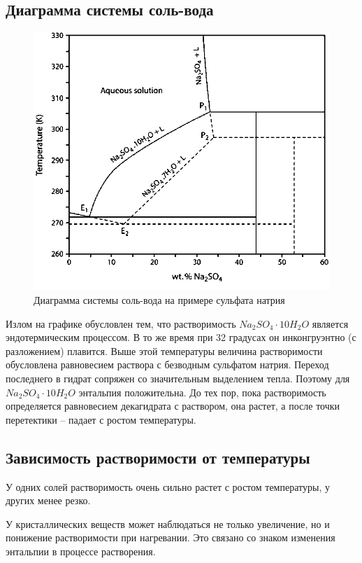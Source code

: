 \documentclass[14pt,a4paper]{scrartcl}
\begin{document}
\subsection*{Диаграмма системы соль-вода}
\begin{figure}[htp]
\centering
\includegraphics[scale=1.00]{h2o-diagram.png}
\caption{Диаграмма системы соль-вода на примере сульфата натрия}
\label{}
\end{figure}


Излом на графике обусловлен тем, что растворимость $Na_2SO_4\cdot10H_2O$ является эндотермическим процессом. В то же время при 32 градусах он инконгруэнтно (с разложением) плавится. Выше этой температуры величина растворимости обусловлена равновесием раствора с безводным сульфатом натрия. Переход последнего в гидрат сопряжен со значительным выделением тепла.  Поэтому для $Na_2SO_4\cdot10H_2O$ энтальпия положительна. До тех пор, пока растворимость определяется равновесием декагидрата с раствором, она растет, а после точки перетектики – падает с ростом температуры.

\subsection*{Зависимость растворимости от температуры}

У одних солей растворимость очень сильно растет с ростом температуры, у других менее резко.

У кристаллических веществ может наблюдаться не только увеличение, но и понижение растворимости при нагревании. Это связано со знаком изменения энтальпии в процессе
растворения. 
\end{document}
